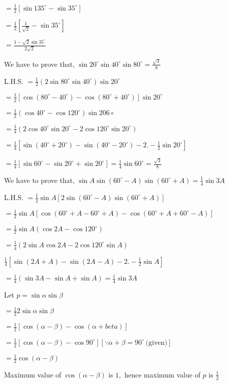   $= \frac{1}{2}[\sin135^\circ - \sin35^\circ]$

  $= \frac{1}{2}\left[\frac{1}{\sqrt{2}} - \sin35^\circ\right]$

  $= \frac{1 - \sqrt{2}\sin 35^\circ}{2\sqrt{2}}$

\item We have to prove that, $\sin 20^\circ \sin 40^\circ\sin 80^\circ = \frac{\sqrt{3}}{8}$

  L.H.S. $= \frac{1}{2}(2\sin80^\circ\sin40^\circ)\sin20^\circ$

  $= \frac{1}{2}[\cos(80^\circ - 40^\circ) - \cos(80^\circ + 40^\circ)]\sin20^\circ$

  $= \frac{1}{2}(\cos40^\circ - \cos120^\circ)\sin 206\circ$

  $= \frac{1}{4}(2\cos40^\circ\sin20^\circ - 2\cos120^\circ\sin20^\circ)$

  $= \frac{1}{4}[\sin(40^\circ + 20^\circ) - \sin(40^\circ - 20^\circ) - 2.-\frac{1}{2}\sin20^\circ]$

  $= \frac{1}{4}[\sin60^\circ - \sin20^\circ + \sin20^\circ] = \frac{1}{4}\sin60^\circ = \frac{\sqrt{3}}{8}$

\item We have to prove that, $\sin A\sin(60^\circ - A)\sin(60^\circ + A) = \frac{1}{4}\sin 3A$

  L.H.S. $= \frac{1}{2}\sin A[2\sin(60^\circ - A)\sin(60^\circ + A)]$

  $= \frac{1}{2}\sin A[\cos(60^\circ + A - 60^\circ + A) - \cos(60^\circ + A + 60^\circ - A)]$

  $= \frac{1}{2}\sin A(\cos 2A - \cos 120^\circ)$

  $= \frac{1}{4}(2\sin A\cos 2A - 2\cos 120^\circ \sin A)$

  $\frac{1}{4}[\sin (2A + A) - \sin(2A - A) - 2.-\frac{1}{2}\sin A]$

  $= \frac{1}{4}(\sin 3A - \sin A + \sin A) = \frac{1}{4}\sin 3A$

\item Let $p = \sin\alpha\sin\beta$

  $= \frac{1}{2}2\sin\alpha\sin\beta$

  $= \frac{1}{2}[\cos(\alpha - \beta) - \cos(\alpha + beta)]$

  $= \frac{1}{2}[\cos(\alpha - \beta) - \cos90^\circ][\because \alpha + \beta = 90^\circ~\text{(given)}]$

  $= \frac{1}{2}\cos(\alpha - \beta)$

  Maximum value of $\cos(\alpha - \beta)$ is $1,$ hence maximum value of $p$ is $\frac{1}{2}$

